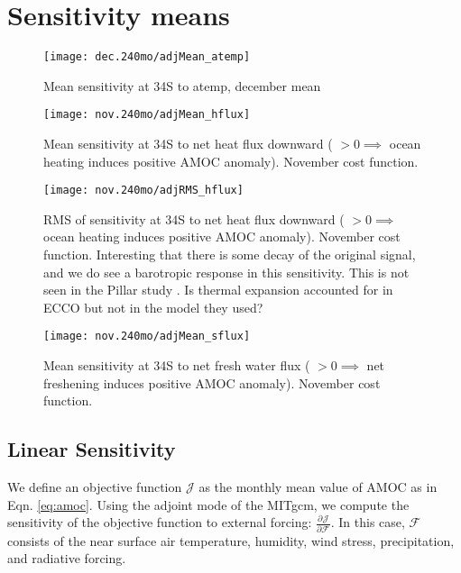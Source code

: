 \documentclass[a4paper,11pt]{article}
\newcommand{\pderiv}[3][]{%
  \ensuremath{\frac{\partial^{#1} {#2}}{\partial {#3}^{#1}}}}
\begin{document}
 \section{Sensitivity means}

   \begin{figure}
    \centering
    \texttt{[image: dec.240mo/adjMean\_atemp]}
    \caption{Mean sensitivity at 34S to atemp, december mean}
    \label{fig:decatemp}
   \end{figure}

   \begin{figure}
    \centering
    \texttt{[image: nov.240mo/adjMean\_hflux]}
    \caption{Mean sensitivity at 34S to net heat flux downward ( $ >0 \implies $ ocean heating induces positive AMOC anomaly). November cost function. }
    \label{fig:novhflux}
   \end{figure}

   \begin{figure}
    \centering
    \texttt{[image: nov.240mo/adjRMS\_hflux]}
    \caption{RMS of sensitivity at 34S to net heat flux downward ( $ >0 \implies $ ocean heating induces positive AMOC anomaly). November cost function. Interesting that there is some decay of the original signal, and we do see a barotropic response in this sensitivity. This is not seen in the Pillar study \cite{pillar}. Is thermal expansion accounted for in ECCO but not in the model they used?}
    \label{fig:novhfluxRMS}
   \end{figure}

   \begin{figure}
    \centering
    \texttt{[image: nov.240mo/adjMean\_sflux]}
    \caption{Mean sensitivity at 34S to net fresh water flux ( $>0 \implies$ net freshening induces positive AMOC anomaly). November cost function.}
    \label{fig:novsflux}
   \end{figure}

  \subsection{Linear Sensitivity}
  \label{linearSensitivity}
  
  We define an objective function $\mathcal{J}$ as the monthly mean value of AMOC as in Eqn. \ref{eq:amoc}. Using the adjoint mode of the MITgcm, we compute the sensitivity of the objective function to external forcing: $\pderiv{\mathcal{J}}{\mathcal{F}}$. In this case, $\mathcal{F}$ consists of the near surface air temperature, humidity, wind stress, precipitation, and radiative forcing.  
	
\end{document}
